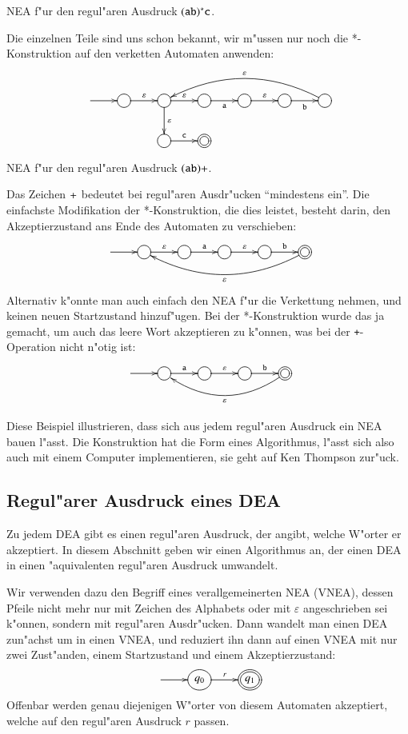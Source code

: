 \begin{beispiel}[\bf Beispiel 2] NEA f"ur den regul"aren Ausdruck
$({\tt ab})^*{\tt c}$. 

Die einzelnen Teile sind uns schon bekannt, wir m"ussen nur noch
die *-Konstruktion auf den verketten Automaten anwenden:
\[
\entrymodifiers={++[o][F]}
\xymatrix{
*+\txt{}\ar[r]
	&{}\ar[r]^{\varepsilon}
		&{}\ar[r]^{\varepsilon}
			\ar[d]^{\varepsilon}
			&\ar[r]_{\tt a}
				&{}\ar[r]^{\varepsilon}
					&{}\ar[r]_{\tt b}
						&{}\ar@/_20pt/[llll]_{\varepsilon}
\\
*+\txt{}
	&*+\txt{}
		&{}\ar[r]^{\tt c}
			&*++[o][F=]{}
}
\]
\end{beispiel}

\begin{beispiel}[\bf Beispiel 3:] NEA f"ur den regul"aren Ausdruck
$({\tt ab})+$.

Das Zeichen ${\tt+}$ bedeutet bei regul"aren Ausdr"ucken ``mindestens ein''.
Die einfachste Modifikation der *-Konstruktion, die dies leistet, besteht
darin, den Akzeptierzustand ans Ende des Automaten zu verschieben:
\[
\entrymodifiers={++[o][F]}
\xymatrix{
*+\txt{}\ar[r]
	&{}\ar[r]^{\varepsilon}
		&{}\ar[r]^{\tt a}
			&{}\ar[r]^{\varepsilon}
				&{}\ar[r]^{\tt b}
					&*++[o][F=]{}\ar@/^20pt/[llll]^{\varepsilon}
}
\]
Alternativ k"onnte man auch einfach den NEA f"ur die Verkettung
nehmen, und keinen neuen Startzustand hinzuf"ugen. Bei der
*-Konstruktion wurde das ja gemacht, um auch das leere Wort
akzeptieren zu k"onnen, was bei der {\tt +}-Operation nicht
n"otig ist:
\[
\entrymodifiers={++[o][F]}
\xymatrix{
*+\txt{}\ar[r]
	&{}\ar[r]^{\tt a}
		&{}\ar[r]^{\varepsilon}
			&{}\ar[r]^{\tt b}
				&*++[o][F=]{}\ar@/^20pt/[lll]^{\varepsilon}
}
\]
\end{beispiel}
Diese Beispiel illustrieren, dass sich aus jedem regul"aren Ausdruck
ein NEA bauen l"asst. Die Konstruktion hat die Form eines Algorithmus,
l"asst sich also auch mit einem Computer implementieren, sie geht
auf Ken Thompson zur"uck.

\subsection{Regul"arer Ausdruck eines DEA}
Zu jedem DEA gibt es einen regul"aren Ausdruck, der angibt,
welche W"orter er akzeptiert.  In diesem Abschnitt geben
wir einen Algorithmus an, der einen DEA in einen "aquivalenten
regul"aren Ausdruck umwandelt. 

Wir verwenden dazu den Begriff eines verallgemeinerten NEA (VNEA),
dessen Pfeile nicht mehr nur mit Zeichen des Alphabets oder mit
$\varepsilon$ angeschrieben sei k"onnen, sondern mit regul"aren
Ausdr"ucken. Dann wandelt man einen DEA zun"achst um in einen
VNEA, und reduziert ihn dann auf einen VNEA mit nur zwei Zust"anden,
einem Startzustand und einem Akzeptierzustand:
\[
\entrymodifiers={++[o][F]}
\xymatrix{
*+\txt{}\ar[r]
	&{q_0}\ar[r]^{r}
		&*++[o][F=]{q_1}
}
\]
Offenbar werden genau diejenigen W"orter von diesem Automaten
akzeptiert, welche auf den regul"aren Ausdruck $r$ passen.

